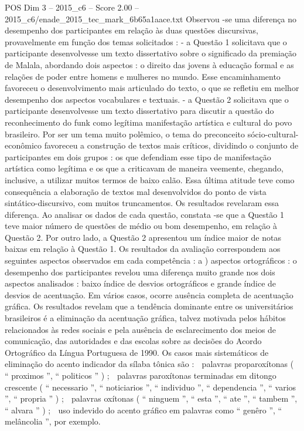 \begin{textsample}{POS Dim 3 – 2015\_c6 – Score 2.00 – 2015\_c6/enade\_2015\_tec\_mark\_6b65a1aace.txt}
Observou -se uma diferença no desempenho dos participantes em relação às duas questões discursivas, provavelmente em função dos temas solicitados : - a Questão 1 solicitava que o participante desenvolvesse um texto dissertativo sobre o significado da premiação de Malala, abordando dois aspectos : o direito das jovens à educação formal e as relações de poder entre homens e mulheres no mundo.
Esse encaminhamento favoreceu o desenvolvimento mais articulado do texto, o que se refletiu em melhor desempenho dos aspectos vocabulares e textuais. - a Questão 2 solicitava que o participante desenvolvesse um texto dissertativo para discutir a questão do reconhecimento do funk como legítima manifestação artística e cultural do povo brasileiro.
Por ser um tema muito polêmico, o tema do preconceito sócio-cultural-econômico favoreceu a construção de textos mais críticos, dividindo o conjunto de participantes em dois grupos : os que defendiam esse tipo de manifestação artística como legítima e os que a criticavam de maneira veemente, chegando, inclusive, a utilizar muitos termos de baixo calão.
Essa última atitude teve como consequência a elaboração de textos mal desenvolvidos do ponto de vista sintático-discursivo, com muitos truncamentos.
Os resultados revelaram essa diferença.
Ao analisar os dados de cada questão, constata -se que a Questão 1 teve maior número de questões de médio ou bom desempenho, em relação à Questão 2.
Por outro lado, a Questão 2 apresentou um índice maior de notas baixas em relação à Questão 1.
Os resultados da avaliação correspondem aos seguintes aspectos observados em cada competência : a ) aspectos ortográficos : o desempenho dos participantes revelou uma diferença muito grande nos dois aspectos analisados : baixo índice de desvios ortográficos e grande índice de desvios de acentuação.
Em vários casos, ocorre ausência completa de acentuação gráfica.
Os resultados revelam que a tendência dominante entre os universitários brasileiros é a eliminação da acentuação gráfica, talvez motivada pelos hábitos relacionados às redes sociais e pela ausência de esclarecimento dos meios de comunicação, das autoridades e das escolas sobre as decisões do Acordo Ortográfico da Língua Portuguesa de 1990.
Os casos mais sistemáticos de eliminação do acento indicador da sílaba tônica são :  palavras proparoxítonas ( “ proximos ”, “ politicos ” ) ;  palavras paroxítonas terminadas em ditongo crescente ( “ necessario ”, “ noticiarios ”, “ individuo ”, “ dependencia ”, “ varios ”, “ propria ” ) ;  palavras oxítonas ( “ ninguem ”, “ esta ”, “ ate ”, “ tambem ”, “ alvara ” ) ;  uso indevido do acento gráfico em palavras como “ genêro ”, “ melâncolia ”, por exemplo.

\end{textsample}
